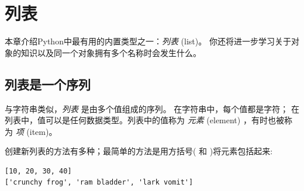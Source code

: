 

\chapter{列表}


本章介绍Python中最有用的内置类型之一：{\em 列表} (list)。 你还将进一步学习关于对象的知识以及同一个对象拥有多个名称时会发生什么。

\section{列表是一个序列}
\label{sequence}


与字符串类似，{\em 列表} 是由多个值组成的序列。 在字符串中，每个值都是字符；
在列表中，值可以是任何数据类型。列表中的值称为 {\em 元素} (element) ，有时也被称为 {\em 项} (item)。

  
  


创建新列表的方法有多种；最简单的方法是用方括号( \li{[} 和 \li{]} )将元素包括起来:

\begin{lstlisting}
[10, 20, 30, 40]
['crunchy frog', 'ram bladder', 'lark vomit']
\end{lstlisting}

%

